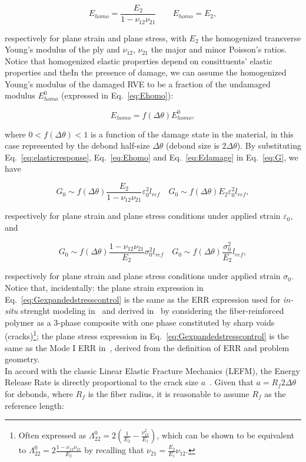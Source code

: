 \documentclass[review]{elsarticle}
\begin{document}
\begin{equation}\label{eq:Ehomo}
E_{homo}=\frac{E_{2}}{1-\nu_{12}\nu_{21}}\qquad E_{homo}=E_{2},
\end{equation}

respectively for plane strain and plane stress, with $E_{2}$ the homogenized transverse Young's modulus of the ply and $\nu_{12}$, $\nu_{21}$ the major and minor Poisson's ratios. Notice that homogenized elastic properties depend on consittuents' elastic properties and theIn the presence of damage, we can assume the homogenized Young's modulus of the damaged RVE to be a fraction of the undamaged modulus $E_{homo}^{0}$ (expressed in Eq.~\ref{eq:Ehomo}):

\begin{equation}\label{eq:Edamage}
E_{homo}=f\left(\Delta\theta\right)E_{homo}^{0},
\end{equation}

where $0<f\left(\Delta\theta\right)<1$ is a function of the damage state in the material, in this case represented by the debond half-size $\Delta\theta$ (debond size is $2\Delta\theta$). By substituting Eq.~\ref{eq:elasticresponse}, Eq.~\ref{eq:Ehomo} and Eq.~\ref{eq:Edamage} in Eq.~\ref{eq:G}, we have

\begin{equation}\label{eq:Gexpandedstraincontrol}
G_{0}\sim f\left(\Delta\theta\right)\frac{E_{2}}{1-\nu_{12}\nu_{21}}\varepsilon_{0}^{2}l_{ref}\quad G_{0}\sim f\left(\Delta\theta\right)E_{2}\varepsilon_{0}^{2}l_{ref},
\end{equation}

respectively for plane strain and plane stress conditions under applied strain $\varepsilon_{0}$, and

\begin{equation}\label{eq:Gexpandedstresscontrol}
G_{0}\sim f\left(\Delta\theta\right)\frac{1-\nu_{12}\nu_{21}}{E_{2}}\sigma_{0}^{2}l_{ref}\quad G_{0}\sim f\left(\Delta\theta\right)\frac{\sigma_{0}^{2}}{E_{2}}l_{ref},
\end{equation}

respectively for plane strain and plane stress conditions under applied strain $\sigma_{0}$. Notice that, incidentally: the plane strain expression in Eq.~\ref{eq:Gexpandedstresscontrol} is the same as the ERR expression used for \textit{in-situ} strenght modeling in~\cite{Camanho2006} and derived in~\cite{Laws1983} by considering the fiber-reinforced polymer as a 3-phase composite with one phase constituted by sharp voids (cracks)\footnote{Often expressed as $\Lambda_{22}^{0}=2\left(\frac{1}{E_{2}}-\frac{\nu_{12}^{2}}{E_{1}}\right)$, which can be shown to be equivalent to $\Lambda_{22}^{0}=2\frac{1-\nu_{12}\nu_{21}}{E_{2}}$ by recalling that $\nu_{21}=\frac{E_{2}}{E_{1}}\nu_{12}$.}; the plane stress expression in Eq.~\ref{eq:Gexpandedstresscontrol} is the same as the Mode I ERR in~\cite{Varna2018}, derived from the definition of ERR and problem geometry.\\
In accord with the classic Linear Elastic Fracture Mechanics (LEFM), the Energy Release Rate is directly proportional to the crack size $a$~\cite{Tada2000}. Given that $a=R_{f}2\Delta\theta$ for debonds, where $R_{f}$ is the fiber radius, it is reasonable to assume $R_{f}$ as the reference length:
\end{document}
